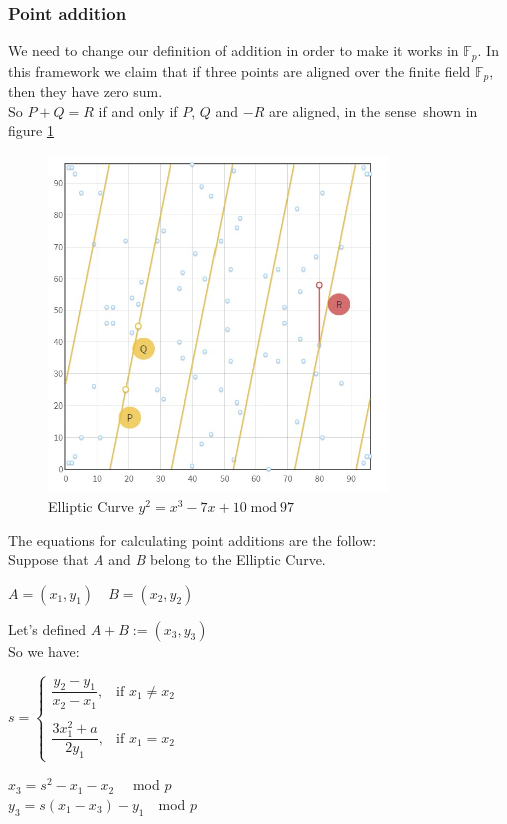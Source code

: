 \subsubsection{Point addition}
We need to change our definition of addition in order to make it works in $\mathbb{F}_p$. 
In this framework we claim that if three points are aligned over the finite field $\mathbb{F}_p$, then they have zero sum. \\
So $P+Q=R$ if and only if $P$, $Q$ and $-R$ are aligned, in the sense\ shown in figure \ref{fig:EC_aligned}
\begin{figure}[ht!]
	\centering
	\includegraphics[width=9cm]{Figures/EC_aligned.jpg}
	\caption{Elliptic Curve $y^2=x^3-7x+10 \; \textrm{mod} \ 97$}
	\label{fig:EC_aligned}
\end{figure}


The equations for calculating point additions are the follow: \\
Suppose that \textit{A} and \textit{B} belong to the Elliptic Curve.

\begin{center}
	$ A=(x_1,y_1) \quad B=(x_2,y_2)$
\end{center}
Let's defined $ A+B :=(x_3,y_3) $ \\
So we have: 

\begin{center} 
	$s=\begin{cases} \dfrac{y_2-y_1}{x_2-x_1}, & \mbox{if } x_1\neq x_2 \\ \\ \dfrac{3x_1^2+a}{2y_1}, & \mbox{if } x_1= x_2\end{cases}$ 
\end{center}
\begin{center} 
	$ x_3=s^2-x_1-x_2  \quad$ mod $p$\\
	$y_3=s(x_1-x_3)-y_1  \quad$mod $p$
\end{center}

